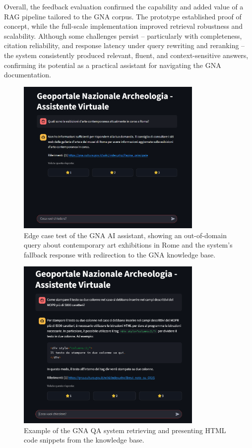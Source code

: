 \begin{spacing}{1.5}
\noindent Overall, the feedback evaluation confirmed the capability and added value of a RAG pipeline tailored to the GNA corpus. The prototype established proof of concept, while the full-scale implementation improved retrieval robustness and scalability. Although some challenges persist -- particularly with completeness, citation reliability, and response latency under query rewriting and reranking -- the system consistently produced relevant, fluent, and context-sensitive answers, confirming its potential as a practical assistant for navigating the GNA documentation.

\vspace{0.5em}
\begin{figure}[H]
  \centering
  \includegraphics[width=0.8\textwidth]{images/edge_case_response.png} 
  \caption{Edge case test of the GNA AI assistant, showing an out-of-domain query about contemporary art exhibitions in Rome and the system’s fallback response with redirection to the GNA knowledge base.}
  \label{fig:edge-case}
\end{figure}

\begin{figure}[H]
  \centering
  \includegraphics[width=0.8\textwidth]{images/risposta_assistente_con_codice.png} 
  \caption{Example of the GNA QA system retrieving and presenting HTML code snippets from the knowledge base.}
  \label{fig:edge-case_code}
\end{figure}


\end{spacing}
